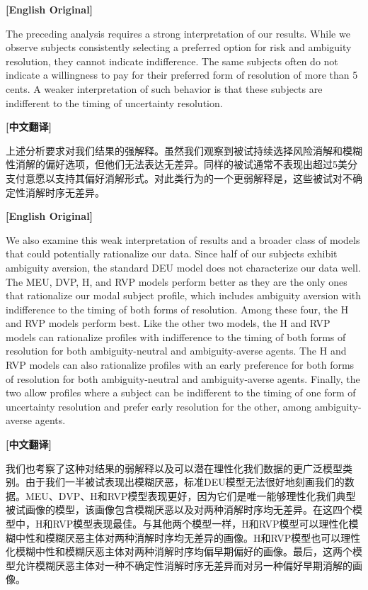 \documentclass[12pt,a4paper]{ctexart}
\newenvironment{original}{%
  \par\medskip\noindent\textbf{[English Original]}\par\smallskip
  \color{black}\small
}{%
  \par\medskip
}
\newenvironment{translation}{%
  \par\noindent\textbf{[中文翻译]}\par\smallskip
  \color{blue}\small
}{%
  \par\bigskip
}
\theoremstyle{definition}
\theoremstyle{remark}
\begin{document}
\begin{original}
The preceding analysis requires a strong interpretation of our results. While we observe subjects consistently selecting a preferred option for risk and ambiguity resolution, they cannot indicate indifference. The same subjects often do not indicate a willingness to pay for their preferred form of resolution of more than 5 cents. A weaker interpretation of such behavior is that these subjects are indifferent to the timing of uncertainty resolution.
\end{original}
\begin{translation}
上述分析要求对我们结果的强解释。虽然我们观察到被试持续选择风险消解和模糊性消解的偏好选项，但他们无法表达无差异。同样的被试通常不表现出超过5美分支付意愿以支持其偏好消解形式。对此类行为的一个更弱解释是，这些被试对不确定性消解时序无差异。
\end{translation}

\begin{original}
We also examine this weak interpretation of results and a broader class of models that could potentially rationalize our data. Since half of our subjects exhibit ambiguity aversion, the standard DEU model does not characterize our data well. The MEU, DVP, H, and RVP models perform better as they are the only ones that rationalize our modal subject profile, which includes ambiguity aversion with indifference to the timing of both forms of resolution. Among these four, the H and RVP models perform best. Like the other two models, the H and RVP models can rationalize profiles with indifference to the timing of both forms of resolution for both ambiguity-neutral and ambiguity-averse agents. The H and RVP models can also rationalize profiles with an early preference for both forms of resolution for both ambiguity-neutral and ambiguity-averse agents. Finally, the two allow profiles where a subject can be indifferent to the timing of one form of uncertainty resolution and prefer early resolution for the other, among ambiguity-averse agents.
\end{original}
\begin{translation}
我们也考察了这种对结果的弱解释以及可以潜在理性化我们数据的更广泛模型类别。由于我们一半被试表现出模糊厌恶，标准DEU模型无法很好地刻画我们的数据。MEU、DVP、H和RVP模型表现更好，因为它们是唯一能够理性化我们典型被试画像的模型，该画像包含模糊厌恶以及对两种消解时序均无差异。在这四个模型中，H和RVP模型表现最佳。与其他两个模型一样，H和RVP模型可以理性化模糊中性和模糊厌恶主体对两种消解时序均无差异的画像。H和RVP模型也可以理性化模糊中性和模糊厌恶主体对两种消解时序均偏早期偏好的画像。最后，这两个模型允许模糊厌恶主体对一种不确定性消解时序无差异而对另一种偏好早期消解的画像。
\end{translation}
\end{document}
